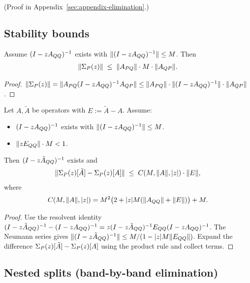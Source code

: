 (Proof in Appendix~\ref{sec:appendix-elimination}.)

\subsection{Stability bounds}

\begin{proposition}
\label{prop:sigma-bound}
Assume $(I - zA_{QQ})^{-1}$ exists with $\|(I - zA_{QQ})^{-1}\| \le M$.
Then
\[
\|\Sigma_{P}(z)\| \;\le\; \|A_{PQ}\| \cdot M \cdot \|A_{QP}\|.
\]
\end{proposition}

\begin{proof}
$\|\Sigma_{P}(z)\| = \|A_{PQ} (I - zA_{QQ})^{-1} A_{QP}\| \le \|A_{PQ}\| \cdot \|(I - zA_{QQ})^{-1}\| \cdot \|A_{QP}\|$.
\end{proof}

\begin{proposition}
\label{prop:perturbation-stability}
Let $A, \tilde{A}$ be operators with $E := \tilde{A} - A$.
Assume:
\begin{itemize}[itemsep=0.2em]
\item $(I - zA_{QQ})^{-1}$ exists with $\|(I - zA_{QQ})^{-1}\| \le M$.
\item $\|z E_{QQ}\| \cdot M < 1$.
\end{itemize}
Then $(I - z\tilde{A}_{QQ})^{-1}$ exists and
\[
\|\Sigma_{P}(z)[\tilde{A}] - \Sigma_{P}(z)[A]\|
\;\le\;
C(M, \|A\|, |z|) \cdot \|E\|,
\]
where
\[
C(M, \|A\|, |z|) = M^2 \bigl( 2 + |z| M (\|A_{QQ}\| + \|E\|) \bigr) + M.
\]
\end{proposition}

\begin{proof}
Use the resolvent identity $(I - z\tilde{A}_{QQ})^{-1} - (I - zA_{QQ})^{-1} = z(I - z\tilde{A}_{QQ})^{-1} E_{QQ} (I - zA_{QQ})^{-1}$.
The Neumann series gives $\|(I - z\tilde{A}_{QQ})^{-1}\| \le M/(1 - |z| M \|E_{QQ}\|)$.
Expand the difference $\Sigma_{P}(z)[\tilde{A}] - \Sigma_{P}(z)[A]$ using the product rule and collect terms.
\end{proof}

\subsection{Nested splits (band-by-band elimination)}

